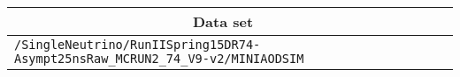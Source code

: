 \begin{center}
\begin{tabular}{ll}
\hline\hline
\multicolumn{1}{c}{Data set}\tabularnewline
\hline
\verb!/SingleNeutrino/RunIISpring15DR74-Asympt25nsRaw_MCRUN2_74_V9-v2/MINIAODSIM! \tabularnewline
\hline
\end{tabular}\end{center}
